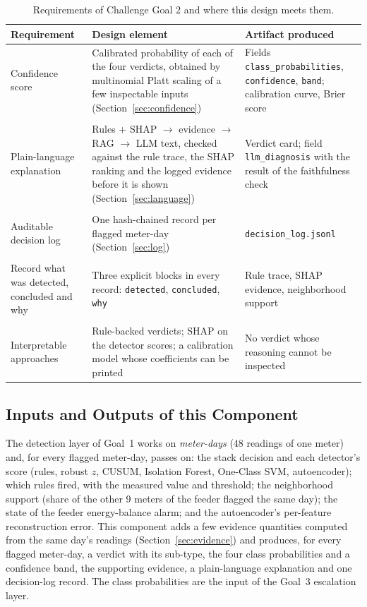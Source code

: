 \documentclass[11pt,a4paper]{article}
\begin{document}
\begin{table}[H]
\centering
\small
\begin{tabularx}{\textwidth}{@{}>{\raggedright\arraybackslash}p{3.4cm}LL@{}}
\toprule
\textbf{Requirement} & \textbf{Design element} & \textbf{Artifact produced} \\
\midrule
Confidence score & Calibrated probability of each of the four verdicts, obtained by multinomial Platt scaling of a few inspectable inputs (Section~\ref{sec:confidence}) & Fields \texttt{class\_probabilities}, \texttt{confidence}, \texttt{band}; calibration curve, Brier score \\ \\
Plain-language explanation & Rules + SHAP $\rightarrow$ evidence $\rightarrow$ RAG $\rightarrow$ LLM text, checked against the rule trace, the SHAP ranking and the logged evidence before it is shown (Section~\ref{sec:language}) & Verdict card; field \texttt{llm\_diagnosis} with the result of the faithfulness check \\ \\
Auditable decision log & One hash-chained record per flagged meter-day (Section~\ref{sec:log}) & \texttt{decision\_log.jsonl} \\ \\
Record what was detected, concluded and why & Three explicit blocks in every record: \texttt{detected}, \texttt{concluded}, \texttt{why} & Rule trace, SHAP evidence, neighborhood support \\ \\
Interpretable approaches & Rule-backed verdicts; SHAP on the detector scores; a calibration model whose coefficients can be printed & No verdict whose reasoning cannot be inspected \\
\bottomrule
\end{tabularx}
\caption{Requirements of Challenge Goal 2 and where this design meets them.}
\label{tab:requirements}
\end{table}

\subsection{Inputs and Outputs of this Component}
\label{sec:io}
The detection layer of Goal~1 works on \emph{meter-days} (48 readings of one meter) and, for every flagged
meter-day, passes on: the stack decision and each detector's score (rules, robust $z$, CUSUM, Isolation
Forest, One-Class SVM, autoencoder); which rules fired, with the measured value and threshold; the
neighborhood support (share of the other 9 meters of the feeder flagged the same day); the state of the
feeder energy-balance alarm; and the autoencoder's per-feature reconstruction error. This component adds a
few evidence quantities computed from the same day's readings (Section~\ref{sec:evidence}) and produces, for
every flagged meter-day, a verdict with its sub-type, the four class probabilities and a confidence band, the
supporting evidence, a plain-language explanation and one decision-log record. The class probabilities are
the input of the Goal~3 escalation layer.
\end{document}
